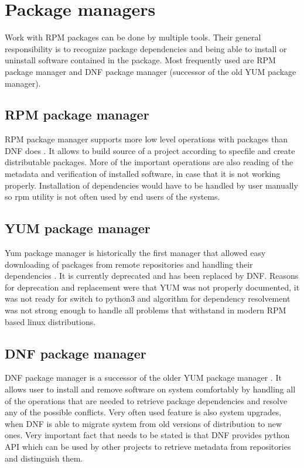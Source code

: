 \section{Package managers}
Work with RPM packages can be done by multiple tools. Their general responsibility is to recognize
package dependencies and being able to install or uninstall software contained in the package.
Most frequently used are RPM package manager and DNF package manager (successor of the old
YUM package manager).

\subsection*{RPM package manager}
RPM package manager supports more low level operations with packages than DNF does \cite{RPMPackageManager}. It allows
to build source of a project according to specfile and create distributable packages. More of the
important operations are also reading of the metadata and verification of installed software, in
case that it is not working properly. Installation of dependencies would have to be handled by user
manually so rpm utility is not often used by end users of the systems.

\subsection*{YUM package manager}
Yum package manager is historically the first manager that allowed easy downloading of packages
from remote repositories and handling their dependencies \cite{YUMPackageManager}. It is currently deprecated and has been
replaced by DNF. Reasons for deprecation and replacement were that YUM was not properly documented,
it was not ready for switch to python3 and algorithm for dependency resolvement was not strong enough
to handle all problems that withstand in modern RPM based linux distributions.

\subsection*{DNF package manager}
DNF package manager is a successor of the older YUM package manager \cite{DNFPackageManager}. It allows user to install and remove software
on system comfortably by handling all of the operations that are needed to retrieve package dependencies
and resolve any of the possible conflicts. Very often used feature is also system upgrades, when
DNF is able to migrate system from old versions of distribution to new ones. Very important fact
that needs to be stated is that DNF provides python API which can be used by other projects to retrieve metadata
from repositories and distinguish them.

